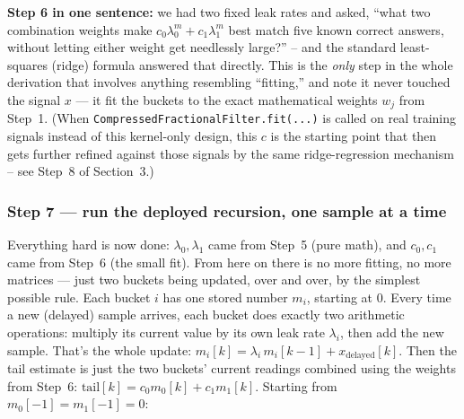 \documentclass[11pt]{article}
\begin{document}
\begin{recap}
\textbf{Step 6 in one sentence:} we had two fixed leak rates and asked, ``what two combination weights make $c_0\lambda_0^m+c_1\lambda_1^m$ best match five known correct answers, without letting either weight get needlessly large?'' -- and the standard least-squares (ridge) formula answered that directly. This is the \emph{only} step in the whole derivation that involves anything resembling ``fitting,'' and note it never touched the signal $x$ --- it fit the buckets to the exact mathematical weights $w_j$ from Step~1. (When \texttt{CompressedFractionalFilter.fit(...)} is called on real training signals instead of this kernel-only design, this $c$ is the starting point that then gets further refined against those signals by the same ridge-regression mechanism -- see Step~8 of Section~3.)
\end{recap}

\subsubsection*{Step 7 --- run the deployed recursion, one sample at a time}
Everything hard is now done: $\lambda_0,\lambda_1$ came from Step~5 (pure math), and $c_0,c_1$ came from Step~6 (the small fit). From here on there is no more fitting, no more matrices --- just two buckets being updated, over and over, by the simplest possible rule. Each bucket $i$ has one stored number $m_i$, starting at $0$. Every time a new (delayed) sample arrives, each bucket does exactly two arithmetic operations: multiply its current value by its own leak rate $\lambda_i$, then add the new sample. That's the whole update: $m_i[k]=\lambda_i\,m_i[k-1]+x_{\text{delayed}}[k]$. Then the tail estimate is just the two buckets' current readings combined using the weights from Step~6: $\text{tail}[k]=c_0 m_0[k]+c_1 m_1[k]$. Starting from $m_0[-1]=m_1[-1]=0$:
\end{document}
